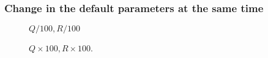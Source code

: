 \subsubsection{Change in the default parameters at the same time}

\begin{figure}[H]
	\scalebox{0.5}{}
	\scalebox{0.5}{}
	\scalebox{0.5}{}

	\caption{$Q / 100, R / 100$}
	\label{fig:q3:Q-R-100}
\end{figure}


\begin{figure}[H]
	\scalebox{0.5}{}
	\scalebox{0.5}{}
	\scalebox{0.5}{}

	\caption{$Q \times 100, R \times 100$.}
	\label{fig:q3:QxRx100}
\end{figure}

